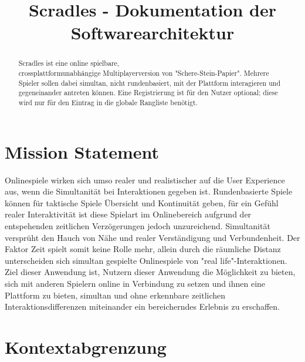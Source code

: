 \documentclass[conference]{IEEEtran}
\title{
Scradles - Dokumentation der Softwarearchitektur
}
\author{\IEEEauthorblockN{Aaron Kreuzer}
\IEEEauthorblockA{
a.kreuzer@oth-aw.de}
\and
\IEEEauthorblockN{Amos Asmerom}
\IEEEauthorblockA{
a.asmerom@oth-aw.de}
\and
\IEEEauthorblockN{Christoph Boni}
\IEEEauthorblockA{
c.boni@oth-aw.de}
\and
\IEEEauthorblockN{Leonard Wöllmer}
\IEEEauthorblockA{
l.woellmer@oth-aw.de}
\and
\IEEEauthorblockN{ Adrian Rall}
\IEEEauthorblockA{
a.rall@oth-aw.de}
\and
\IEEEauthorblockN{ Tahata Djoumsi}
\IEEEauthorblockA{
d.tahata@oth-aw.de}
}
\begin{document}
\maketitle
\thispagestyle{empty}
\pagestyle{empty}


\begin{abstract}

Scradles ist eine online spielbare,
\\ crossplattformunabhängige Multiplayerversion von "Schere-Stein-Papier". Mehrere Spieler sollen dabei simultan, nicht rundenbasiert, mit der Plattform interagieren und gegeneinander antreten können. Eine Registrierung ist für den Nutzer optional; diese wird nur für den Eintrag in die globale Rangliste benötigt.

\end{abstract}


\section{Mission Statement}
Onlinespiele wirken sich umso realer und realistischer auf die User Experience aus, wenn die Simultanität bei Interaktionen gegeben ist. Rundenbasierte Spiele können für taktische Spiele Übersicht und Kontinuität geben, für ein Gefühl realer Interaktivität ist diese Spielart im Onlinebereich aufgrund der entspehenden zeitlichen Verzögerungen jedoch unzureichend. Simultanität versprüht den Hauch von Nähe und realer Verständigung und Verbundenheit. Der Faktor Zeit spielt somit keine Rolle mehr, allein durch die räumliche Distanz unterscheiden sich  simultan gespielte Onlinespiele von "real life"-Interaktionen.
Ziel dieser Anwendung ist, Nutzern dieser Anwendung die Möglichkeit zu bieten, sich mit anderen Spielern online in Verbindung zu setzen und ihnen eine Plattform zu bieten, simultan und ohne erkennbare zeitlichen Interaktionsdifferenzen miteinander ein bereicherndes Erlebnis zu erschaffen.


\section{Kontextabgrenzung}
\end{document}
